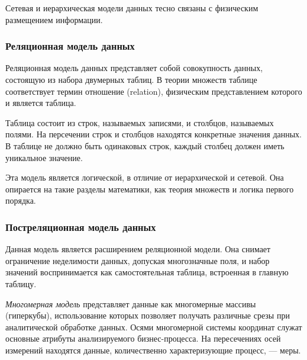 Сетевая и иерархическая модели данных тесно связаны с физическим размещением информации.



\subsubsection*{Реляционная модель данных}

Реляционная модель данных представляет собой совокупность данных, состоящую из набора двумерных таблиц. В теории множеств таблице соответствует термин отношение (relation), физическим представлением которого и является таблица. 

Таблица состоит из строк, называемых записями, и столбцов, называемых полями. На персечении строк и столбцов находятся конкретные значения данных. В таблице не должно быть одинаковых строк, каждый столбец должен иметь уникальное значение.

Эта модель является логической, в отличие от иерархической и сетевой. Она опирается на такие разделы математики, как теория множеств и логика первого порядка.

\subsubsection{Постреляционная модель данных}

Данная модель является расширением реляционной модели. Она снимает ограничение неделимости данных, допуская многозначные поля, и набор значений воспринимается как самостоятельная таблица, встроенная в главную таблицу\cite{postrel}.

\textit{Многомерная модель} представляет данные как многомерные массивы (гиперкубы), использование которых позволяет получать различные срезы при аналитической обработке данных. Осями многомерной системы координат служат основные атрибуты анализируемого бизнес-процесса. На пересечениях осей измерений находятся данные, количественно характеризующие процесс, — меры\cite{postrel2}.

